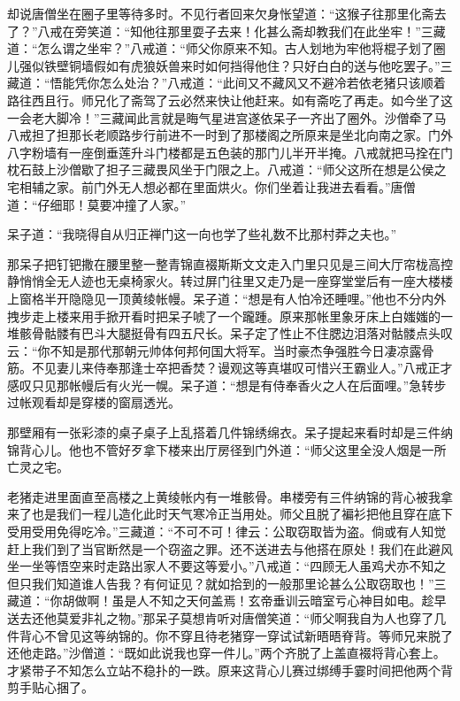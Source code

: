 \documentclass[12pt,UTF8]{ctexbook}
\begin{document}
却说唐僧坐在圈子里等待多时。不见行者回来欠身怅望道：“这猴子往那里化斋去了？”八戒在旁笑道：“知他往那里耍子去来！化甚么斋却教我们在此坐牢！”三藏道：“怎么谓之坐牢？”八戒道：“师父你原来不知。古人划地为牢他将棍子划了圈儿强似铁壁铜墙假如有虎狼妖兽来时如何挡得他住？只好白白的送与他吃罢子。”三藏道：“悟能凭你怎么处治？”八戒道：“此间又不藏风又不避冷若依老猪只该顺着路往西且行。师兄化了斋驾了云必然来快让他赶来。如有斋吃了再走。如今坐了这一会老大脚冷！”三藏闻此言就是晦气星进宫遂依呆子一齐出了圈外。沙僧牵了马八戒担了担那长老顺路步行前进不一时到了那楼阁之所原来是坐北向南之家。门外八字粉墙有一座倒垂莲升斗门楼都是五色装的那门儿半开半掩。八戒就把马拴在门枕石鼓上沙僧歇了担子三藏畏风坐于门限之上。八戒道：“师父这所在想是公侯之宅相辅之家。前门外无人想必都在里面烘火。你们坐着让我进去看看。”唐僧道：“仔细耶！莫要冲撞了人家。”

呆子道：“我晓得自从归正禅门这一向也学了些礼数不比那村莽之夫也。”

那呆子把钉钯撒在腰里整一整青锦直裰斯斯文文走入门里只见是三间大厅帘栊高控静悄悄全无人迹也无桌椅家火。转过屏门往里又走乃是一座穿堂堂后有一座大楼楼上窗格半开隐隐见一顶黄绫帐幔。呆子道：“想是有人怕冷还睡哩。”他也不分内外拽步走上楼来用手掀开看时把呆子唬了一个躘踵。原来那帐里象牙床上白媸媸的一堆骸骨骷髅有巴斗大腿挺骨有四五尺长。呆子定了性止不住腮边泪落对骷髅点头叹云：“你不知是那代那朝元帅体何邦何国大将军。当时豪杰争强胜今日凄凉露骨筋。不见妻儿来侍奉那逢士卒把香焚？谩观这等真堪叹可惜兴王霸业人。”八戒正才感叹只见那帐幔后有火光一幌。呆子道：“想是有侍奉香火之人在后面哩。”急转步过帐观看却是穿楼的窗扇透光。

那壁厢有一张彩漆的桌子桌子上乱搭着几件锦绣绵衣。呆子提起来看时却是三件纳锦背心儿。他也不管好歹拿下楼来出厅房径到门外道：“师父这里全没人烟是一所亡灵之宅。

老猪走进里面直至高楼之上黄绫帐内有一堆骸骨。串楼旁有三件纳锦的背心被我拿来了也是我们一程儿造化此时天气寒冷正当用处。师父且脱了褊衫把他且穿在底下受用受用免得吃冷。”三藏道：“不可不可！律云：公取窃取皆为盗。倘或有人知觉赶上我们到了当官断然是一个窃盗之罪。还不送进去与他搭在原处！我们在此避风坐一坐等悟空来时走路出家人不要这等爱小。”八戒道：“四顾无人虽鸡犬亦不知之但只我们知道谁人告我？有何证见？就如拾到的一般那里论甚么公取窃取也！”三藏道：“你胡做啊！虽是人不知之天何盖焉！玄帝垂训云暗室亏心神目如电。趁早送去还他莫爱非礼之物。”那呆子莫想肯听对唐僧笑道：“师父啊我自为人也穿了几件背心不曾见这等纳锦的。你不穿且待老猪穿一穿试试新晤晤脊背。等师兄来脱了还他走路。”沙僧道：“既如此说我也穿一件儿。”两个齐脱了上盖直裰将背心套上。才紧带子不知怎么立站不稳扑的一跌。原来这背心儿赛过绑缚手霎时间把他两个背剪手贴心捆了。
\end{document}
